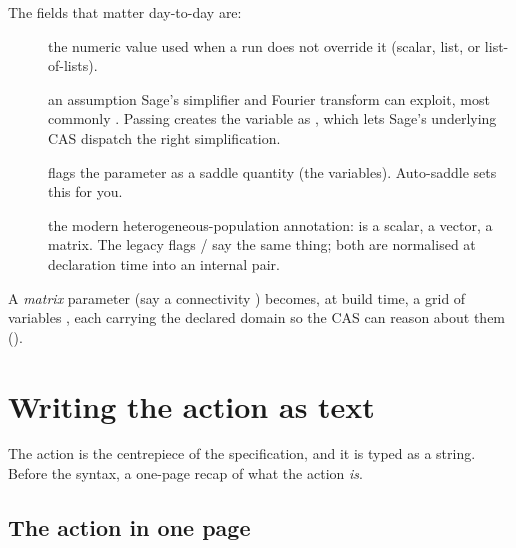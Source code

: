 The fields that matter day-to-day are:

\begin{description}
  \item[] the numeric value used when a run does not override it
        (scalar, list, or list-of-lists).
  \item[] an assumption Sage's simplifier and Fourier transform can
        exploit, most commonly . Passing
         creates the variable as
        , which lets Sage's underlying CAS
        dispatch the right simplification.
  \item[]  flags the parameter as a saddle quantity
        (the  variables). Auto-saddle sets this for you.
  \item[] the modern heterogeneous-population annotation:
        \code{[]} is a scalar, \code{['E']} a vector, \code{['E','I']} a matrix.
        The legacy flags  /  say the same thing; both
        are normalised at declaration time into an internal
         pair.
\end{description}

A \emph{matrix} parameter (say a connectivity ) becomes, at build time, a
grid of  variables , each carrying the declared
domain so the CAS can reason about them ().

\section{Writing the action as text}

The action is the centrepiece of the specification, and it is typed as a string.
Before the syntax, a one-page recap of what the action \emph{is}.

\subsection{The \msrjd{} action in one page}

